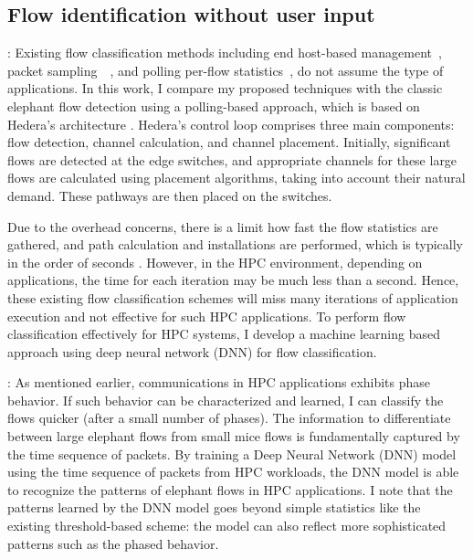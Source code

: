 \subsection{Flow identification without user input}


\vspace{0.08in}
:
Existing flow classification methods including end host-based
management~\cite{xu2015identifying},
packet sampling~\cite{suh2014opensample}~\cite{afek2015sampling},
and polling per-flow statistics~\cite{yang2020flow}, do not assume
the type of applications. In this work, I compare my proposed techniques with
the classic elephant flow detection using a polling-based approach,
which is based on Hedera's architecture \cite{al2010hedera}.
Hedera's control loop comprises
three main components: flow detection, channel calculation, and channel
placement. Initially, significant 
flows are detected at the edge switches, and appropriate channels for these 
large flows are calculated using placement algorithms, taking into account 
their natural demand. These pathways are then placed on the switches.

Due to the overhead concerns, there is a limit how fast the flow statistics
are gathered, and path calculation and installations are performed, which is typically
in the order of seconds \cite{al2010hedera}.
However, in the HPC environment, depending
on applications, the time for each iteration may be much less than a second.
Hence, these existing flow classification schemes will miss many iterations
of application execution and not effective for such HPC applications.
To perform flow classification effectively for HPC systems, I develop
a machine learning based approach using deep neural network (DNN)
for flow classification.

\vspace{0.08in}
:
As mentioned earlier, communications in HPC applications exhibits phase
behavior. If such behavior can be characterized and learned, I can classify
the flows quicker (after a small number of phases).
The information to differentiate between large elephant flows from
small mice flows is fundamentally captured by the time sequence of packets.
By training a Deep Neural Network (DNN) model using the time sequence of
packets from HPC workloads, the DNN model is able to recognize the
patterns of elephant flows in HPC applications. I note that the patterns
learned by the DNN model goes beyond simple statistics like
the existing threshold-based scheme: the model can also reflect more
sophisticated patterns such as the phased behavior. 


